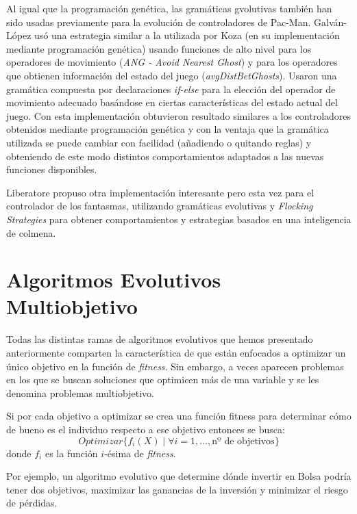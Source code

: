 \blankline

Al igual que la programación genética, las gramáticas gvolutivas también han sido usadas previamente para la evolución de controladores de Pac-Man. Galván-López \cite{galvan2010evolving} usó una estrategia similar a la utilizada por Koza (en su implementación mediante programación genética) usando funciones de alto nivel para los operadores de movimiento (\textit{ANG - Avoid Nearest Ghost}) y para los operadores que obtienen información del estado del juego (\textit{avgDistBetGhosts}). Usaron una gramática compuesta por declaraciones \textit{if-else} para la elección del operador de movimiento adecuado basándose en ciertas características del estado actual del juego. Con esta implementación obtuvieron resultado similares a los controladores obtenidos mediante programación genética y con la ventaja que la gramática utilizada se puede cambiar con facilidad (añadiendo o quitando reglas) y obteniendo de este modo distintos comportamientos adaptados a las nuevas funciones disponibles.

Liberatore \cite{Liberatore2014} propuso otra implementación interesante pero esta vez para el controlador de los fantasmas, utilizando gramáticas evolutivas y \textit{Flocking Strategies} para obtener comportamientos y estrategias basados en una inteligencia de colmena.

\section{Algoritmos Evolutivos Multiobjetivo}
Todas las distintas ramas de algoritmos evolutivos que hemos presentado anteriormente comparten la característica de que están enfocados a optimizar  un único objetivo en la  función de \textit{fitness}. Sin embargo, a veces aparecen problemas en los que se buscan soluciones que optimicen más de una variable y se les denomina problemas multiobjetivo.

Si por cada objetivo a optimizar se crea una función fitness para determinar cómo de bueno es el individuo respecto a ese objetivo entonces se busca:
\begin{equation}
Optimizar \{f_i(X) \mid \forall i = 1, \dots, \textrm{nº de objetivos}\}
\end{equation}
donde $f_i$ es la función $i$-ésima de \textit{fitness}.

Por ejemplo, un algoritmo evolutivo que determine dónde invertir en Bolsa podría tener dos objetivos, maximizar las ganancias de la inversión y minimizar el riesgo de pérdidas.

